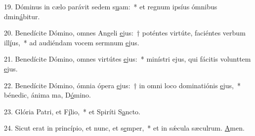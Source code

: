 19. Dóminus in cælo parávit sedem s\uline{u}am:~* et regnum ipsíus ómnibus dmin\uline{á}bitur.\par 
20. Benedícite Dómino, omnes Angeli \uline{e}jus:~† poténtes virtúte, faciéntes verbum ill\uline{í}us,~* ad audiéndam vocem sermnum \uline{e}jus.\par 
21. Benedícite Dómino, omnes virtútes \uline{e}jus:~* minístri ejus, qui fácitis volunttem \uline{e}jus.\par 
22. Benedícite Dómino, ómnia ópera \uline{e}jus:~† in omni loco dominatiónis \uline{e}jus,~* bénedic, ánima ma, D\uline{ó}mino.\par 
23. Glória Patri, et F\uline{í}lio,~* et Spiríti S\uline{a}ncto.\par 
24. Sicut erat in princípio, et nunc, et s\uline{e}mper,~* et in sǽcula sæculrum. \uline{A}men.\par 
